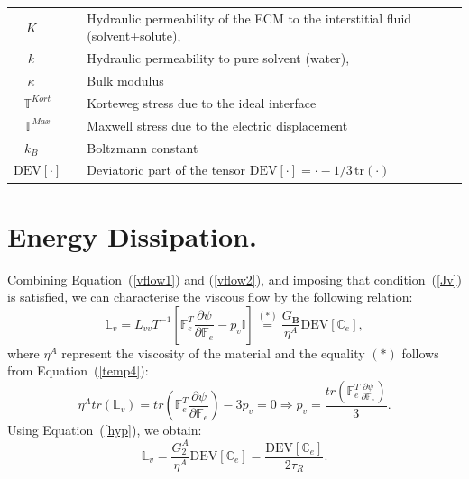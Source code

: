 \documentclass[runningheads]{llncs}
\newcommand{\F}{\ensuremath{\mathbb{F}}}
\newcommand{\LL}{\ensuremath{\mathbb{L}}}
\begin{document}
\begin{table}[h]
\begin{tabular}{c  l}
	$K\qquad$ &  Hydraulic permeability of the ECM to the interstitial fluid (solvent+solute),\\
	$k\qquad$ &  Hydraulic  permeability  to  pure  solvent (water),\\
	$\kappa\qquad$ & Bulk modulus\\
	$\mathbb{T}^{Kort}\quad$ & Korteweg stress due to the ideal interface\\
	$\mathbb{T}^{Max}\quad$ & Maxwell stress due to the electric displacement\\
	$k_B\qquad$ & Boltzmann constant\\
	$\text{DEV}\left[\cdot\right]\quad$ & Deviatoric part of the tensor $\text{DEV}\left[\cdot\right] = \cdot-1/3\, \text{tr}(\cdot)$
\end{tabular}	
\end{table}
\section{Energy Dissipation.}
\label{apenergy}
Combining Equation~(\ref{vflow1}) and (\ref{vflow2}), and imposing that condition~(\ref{Jv}) is satisfied, we can characterise the viscous flow by the following relation:
\begin{equation}
\LL_v = L_{vv}T^{-1}\left[\F_e^T\frac{\partial \psi}{\partial \F_e}-p_v\mathbb{I}\right] \stackrel{(\ast)}{=} \frac{G_\mathbf{B}}{\eta^A}\text{DEV}\left[\mathbb{C}_e\right] ,
\end{equation}
where $\eta^A$ represent the viscosity of the material and the equality $(\ast)$ follows from Equation~(\ref{temp4}):
\begin{equation}
\eta^A tr(\LL_v)= tr\left(\F_e^T\frac{\partial \psi}{\partial \F_e}\right) -  3 p_v=0 \Longrightarrow  p_v = \frac{tr\left(\F_e^T\frac{\partial \psi}{\partial \F_e}\right)}{3}.
\end{equation}
Using Equation~(\ref{hyp}), we obtain:
\begin{equation}
\LL_v = \frac{G^A_2 }{\eta^A}\text{DEV}[\mathbb{C}_e] = \frac{\text{DEV}[\mathbb{C}_e]}{2\tau_R}.\label{apBe}
\end{equation}
\end{document}
